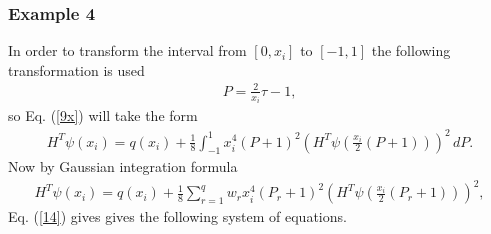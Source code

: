 \documentclass{beamer}
\begin{document}
\begin{frame}\frametitle{Example 4}
	\justifying
In order to transform the interval from $[0, x_{i}]$ to $[-1, 1]$ the following transformation is used
\begin{eqnarray}\label{10}
P=\frac{2}{x_{i}}\tau-1,\nonumber
\end{eqnarray}
\small
so Eq. (\ref{9x}) will take the form
\tiny
\begin{eqnarray}\label{11}
H^{T}\psi(x_{i})=q(x_{i})+\frac{1}{8}\int^1_{-1}x_{i}^{4}(P+1)^{2}\left(H^{T}\psi\left(\frac{x_{i}}{2}(P+1)\right)\right)^{2}\,dP.
\end{eqnarray}
\small
Now by Gaussian integration formula
\tiny
\begin{eqnarray}\label{14}
H^{T}\psi(x_{i})=q(x_{i})+\frac{1}{8}\sum_{r=1}^{q}w_{r}x_{i}^{4}(P_{r}+1)^{2}\left(H^{T}\psi\left(\frac{x_{i}}{2}(P_{r}+1)\right)\right)^{2},
\end{eqnarray}
\small
Eq. (\ref{14}) gives gives the following system of equations.
\end{frame}
\end{document}
